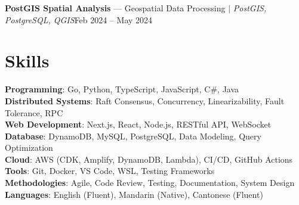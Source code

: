 \documentclass[letterpaper,11pt]{article}
\begin{document}
      \resumeProjectHeading
          {\textbf{PostGIS Spatial Analysis} — Geospatial Data Processing $|$ \emph{PostGIS, PostgreSQL, QGIS}}{Feb 2024 -- May 2024}
          \resumeItemListStart
          \resumeItemListEnd
    \resumeSubHeadingListEnd

\section{Skills}
 \begin{itemize}[leftmargin=0.15in, label={}]
    \small{\item{
     \textbf{Programming}{: Go, Python, TypeScript, JavaScript, C\#, Java} \\
     \textbf{Distributed Systems}{: Raft Consensus, Concurrency, Linearizability, Fault Tolerance, RPC} \\
     \textbf{Web Development}{: Next.js, React, Node.js, RESTful API, WebSocket} \\
     \textbf{Database}{: DynamoDB, MySQL, PostgreSQL, Data Modeling, Query Optimization} \\
     \textbf{Cloud}{: AWS (CDK, Amplify, DynamoDB, Lambda), CI/CD, GitHub Actions} \\
     \textbf{Tools}{: Git, Docker, VS Code, WSL, Testing Frameworks} \\
     \textbf{Methodologies}{: Agile, Code Review, Testing, Documentation, System Design} \\
     \textbf{Languages}{: English (Fluent), Mandarin (Native), Cantonese (Fluent)}
    }}
 \end{itemize}

\end{document}
